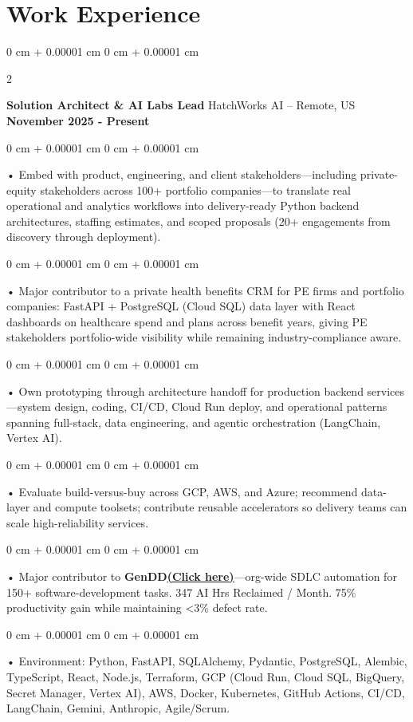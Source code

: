 \documentclass[10pt, letterpaper]{article}
\newenvironment{onecolentry}{
    \begin{adjustwidth}{
        0 cm + 0.00001 cm
    }{
        0 cm + 0.00001 cm
    }
}{
    \end{adjustwidth}
} %
\newenvironment{twocolentry}[2][]{
    \onecolentry
    \def\secondColumn{#2}
    \setcolumnwidth{\fill, 4.5 cm}
    \begin{paracol}{2}
}{
    \switchcolumn \raggedleft \secondColumn
    \end{paracol}
    \endonecolentry
} %
\begin{document}
    \vspace{0.5cm}
    \section{Work Experience}
        \vspace{0.1cm}

        \begin{twocolentry}{
            \textbf{November 2025 - Present}
        }
            \textbf{Solution Architect \& AI Labs Lead} HatchWorks AI -- Remote, US\end{twocolentry}

        \begin{onecolentry}
             • Embed with product, engineering, and client stakeholders---including private-equity stakeholders across 100+ portfolio companies---to translate real operational and analytics workflows into delivery-ready Python backend architectures, staffing estimates, and scoped proposals (20+ engagements from discovery through deployment).
        \end{onecolentry}
        \begin{onecolentry}
             • Major contributor to a private health benefits CRM for PE firms and portfolio companies: FastAPI + PostgreSQL (Cloud SQL) data layer with React dashboards on healthcare spend and plans across benefit years, giving PE stakeholders portfolio-wide visibility while remaining industry-compliance aware.
        \end{onecolentry}
        \begin{onecolentry}
             • Own prototyping through architecture handoff for production backend services---system design, coding, CI/CD, Cloud Run deploy, and operational patterns spanning full-stack, data engineering, and agentic orchestration (LangChain, Vertex AI).
        \end{onecolentry}
        \begin{onecolentry}
             • Evaluate build-versus-buy across GCP, AWS, and Azure; recommend data-layer and compute toolsets; contribute reusable accelerators so delivery teams can scale high-reliability services.
        \end{onecolentry}
        \begin{onecolentry}
             • Major contributor to \textbf{GenDD}\href{https://hatchworks.com/generative-driven-development/}{\textbf{(Click here)}}---org-wide SDLC automation for 150+ software-development tasks. 347 AI Hrs Reclaimed / Month. 75\% productivity gain while maintaining <3\% defect rate.
        \end{onecolentry}
        \begin{onecolentry}
             • Environment: Python, FastAPI, SQLAlchemy, Pydantic, PostgreSQL, Alembic, TypeScript, React, Node.js, Terraform, GCP (Cloud Run, Cloud SQL, BigQuery, Secret Manager, Vertex AI), AWS, Docker, Kubernetes, GitHub Actions, CI/CD, LangChain, Gemini, Anthropic, Agile/Scrum.
        \end{onecolentry}
\end{document}
